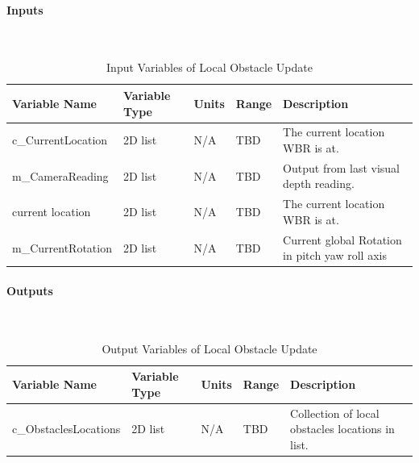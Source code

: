 \documentclass[12pt]{article}
\begin{document}
            \paragraph{Inputs}
                ~\newline
                \begin{table}[H]
                  \centering
                    \caption{Input Variables of Local Obstacle Update} 
                    \label{tbl:Input Variables of Local Obstacle Update}
                  \begin{tabularx}{\textwidth}{|p{5cm}|p{1.2cm}|p{1.2cm}|p{1cm}|X|}
                    \hline Variable Name & Variable Type & Units & Range & Description \\
                    \hline c\_CurrentLocation & 2D list &  N/A & TBD & The current location WBR is at.\\
                    \hline m\_CameraReading & 2D list &  N/A & TBD & Output from last visual depth reading.\\
                    \hline current location & 2D list &  N/A & TBD & The current location WBR is at.\\
                    \hline m\_CurrentRotation & 2D list & N/A & TBD & Current global Rotation in pitch yaw roll axis\\
                    \hline
                  \end{tabularx}
                \end{table} 
            \paragraph{Outputs}
                ~\newline
                \begin{table}[H]
                  \centering
                    \caption{Output Variables of Local Obstacle Update} 
                    \label{tbl:Output Variables of Local Obstacle Update}
                  \begin{tabularx}{\textwidth}{|p{5cm}|p{1.2cm}|p{1.2cm}|p{1cm}|X|}
                    \hline Variable Name & Variable Type & Units & Range & Description \\
                    \hline c\_ObstaclesLocations & 2D list &  N/A & TBD & Collection of local obstacles locations in list.\\
                    \hline
                  \end{tabularx}
                \end{table}                     
\end{document}
